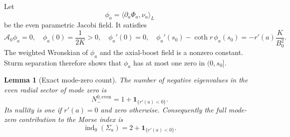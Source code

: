 \documentclass[11pt]{article}
\newtheorem{lemma}[theorem]{Lemma}
\begin{document}
Let
\[
 \phi_a=\langle\partial_a\Phi_a,\nu_a\rangle_L
\]
be the even parametric Jacobi field.  It satisfies
\begin{equation}\label{eq:parametric-data-reduction}
 \mathcal A_0\phi_a=0,
 \quad \phi_a(0)=\frac1{2K}>0,
 \quad \phi_a'(0)=0,
 \quad
 \phi_a'(s_0)-\coth r\,\phi_a(s_0)
 =-r'(a)\frac K{B_0^2}.
\end{equation}
The weighted Wronskian of $\phi_a$ and the axial-boost field is a
nonzero constant.  Sturm separation therefore shows that $\phi_a$ has
at most one zero in $(0,s_0]$.

\begin{lemma}[Exact mode-zero count]\label{lem:mode-zero-count-reduction}
The number of negative eigenvalues in the even radial sector of mode
zero is
\[
 N_-^{0,\mathrm{even}}
 =1+\mathbf 1_{\{r'(a)<0\}}.
\]
Its nullity is one if $r'(a)=0$ and zero otherwise.  Consequently the
full mode-zero contribution to the Morse index is
\begin{equation}\label{eq:mode-zero-index-reduction}
 \operatorname{ind}_0(\Sigma_a)
 =2+\mathbf 1_{\{r'(a)<0\}}.
\end{equation}
\end{lemma}
\end{document}
